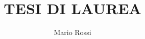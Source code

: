 \documentclass[12pt,twoside,a4paper,fleqn,openright]{book}
\author{Mario Rossi}
\title{TESI DI LAUREA}
\begin{document}

\maketitle

\pagestyle{empty}

\tableofcontents


\pagestyle{fancyplain}
\addtolength{\headwidth}{\marginparsep}
\addtolength{\headwidth}{\marginparwidth}
\renewcommand{\chaptermark}[1]{\markboth{{\chaptername\ \thechapter}\ \--- #1}{}} %
\renewcommand{\sectionmark}[1]{\markright{\thesection\ \ #1}}
\lhead[\fancyplain{}{\thepage}]{\fancyplain{}{\emph\rightmark}}
\rhead[\fancyplain{}{\emph\leftmark}]{\fancyplain{}{\thepage}}
\cfoot{}

         
         

\begin{comment} 


\listoffigures

\listoftables

\end{comment}
\end{document}
